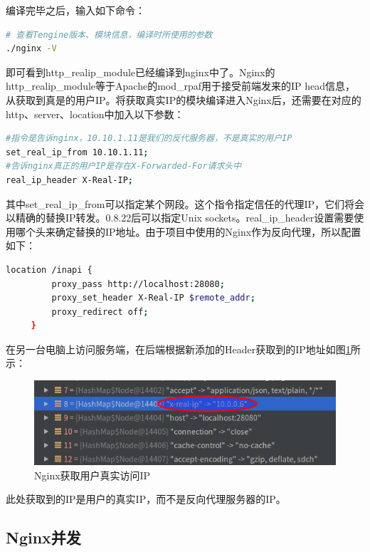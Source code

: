 \documentclass[letter]{book}
\begin{document}
编译完毕之后，输入如下命令：

\begin{lstlisting}[language=bash]
# 查看Tengine版本、模块信息，编译时所使用的参数
./nginx -V
\end{lstlisting}

即可看到http\_realip\_module已经编译到nginx中了。Nginx的http\_realip\_module等于Apache的mod\_rpaf用于接受前端发来的IP head信息，从获取到真是的用户IP。将获取真实IP的模块编译进入Nginx后，还需要在对应的http、server、location中加入以下参数：

\begin{lstlisting}[language=bash]
#指令是告诉nginx，10.10.1.11是我们的反代服务器，不是真实的用户IP
set_real_ip_from 10.10.1.11;
#告诉nginx真正的用户IP是存在X-Forwarded-For请求头中
real_ip_header X-Real-IP;
\end{lstlisting}

其中set\_real\_ip\_from可以指定某个网段。这个指令指定信任的代理IP，它们将会以精确的替换IP转发。0.8.22后可以指定Unix sockets。real\_ip\_header设置需要使用哪个头来确定替换的IP地址。由于项目中使用的Nginx作为反向代理，所以配置如下：

\begin{lstlisting}[language=bash]
location /inapi {
         proxy_pass http://localhost:28080;
         proxy_set_header X-Real-IP $remote_addr;
         proxy_redirect off;
     }
\end{lstlisting}

在另一台电脑上访问服务端，在后端根据新添加的Header获取到的IP地址如图\ref{fig:nginxgetrealip}所示：

\begin{figure}[htbp]
	\centering
	\includegraphics[scale=0.6]{nginxgetrealip.png}
	\caption{Nginx获取用户真实访问IP}
	\label{fig:nginxgetrealip}
\end{figure}

此处获取到的IP是用户的真实IP，而不是反向代理服务器的IP。

\subsection{Nginx并发}
\end{document}
